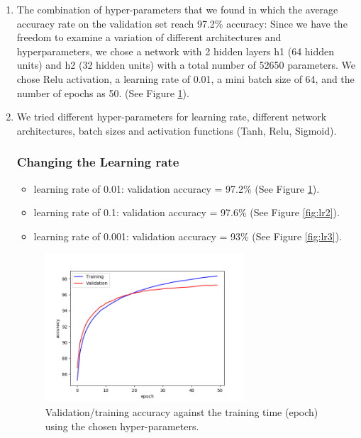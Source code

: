 \documentclass[a4paper]{article}
\begin{document}
\begin{enumerate}

\item
The combination of hyper-parameters that we found in which the average accuracy rate on the validation set reach 97.2\% accuracy:
Since we have the freedom to examine a variation of different architectures and hyperparameters, we chose a network with 2 hidden layers h1 (64 hidden units) and h2 (32 hidden units) with a total number of 52650 parameters. We chose Relu activation, a learning rate of 0.01, a mini batch size of 64, and the number of epochs as 50. (See Figure \ref{fig:hyper}).

\item 
We tried different hyper-parameters for learning rate, different network architectures, batch sizes and activation functions (Tanh, Relu, Sigmoid).

\subsubsection{Changing the Learning rate}


\begin{itemize}

\item learning rate of 0.01: validation accuracy = 97.2\% (See Figure \ref{fig:hyper}).

\item learning rate of 0.1: validation accuracy = 97.6\% (See Figure \ref{fig:lr2}).

\item learning rate of 0.001: validation accuracy = 93\% (See Figure \ref{fig:lr3}).  
  
\end{itemize}

\begin{figure}
\centering
\includegraphics[width=0.7\textwidth]{acc_hyper.png}
\caption{\label{fig:hyper}Validation/training accuracy against the training time (epoch) using the chosen hyper-parameters.}
\end{figure}


\end{enumerate}
\end{document}
